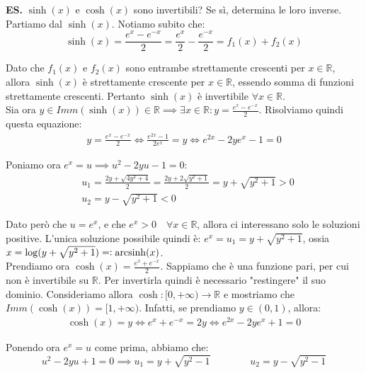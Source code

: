 \documentclass{article}
\DeclareMathOperator{\arcsinh}{arcsinh}
\begin{document}
\noindent\textbf{ES.} $\sinh(x)$ e $\cosh(x)$ sono invertibili? Se sì, determina le loro inverse. \\
Partiamo dal $\sinh(x)$. Notiamo subito che:
\begin{equation*}
    \sinh(x) = \frac{e^x - e^{-x}}{2} = \frac{e^x}{2} - \frac{e^{-x}}{2} = f_1(x) + f_2(x)
\end{equation*}

\noindent Dato che $f_1(x)$ e $f_2(x)$ sono entrambe strettamente crescenti per $x \in \mathbb{R}$, allora $\sinh(x)$ è strettamente crescente per $x \in \mathbb{R}$, essendo somma di funzioni strettamente crescenti. Pertanto $\sinh(x)$ è invertibile $\forall x \in \mathbb{R}$.\\
Sia ora $y \in Imm(\sinh(x)) \in \mathbb{R} \implies \exists x \in \mathbb{R} : y = \frac{e^x - e^{-x}}{2}$. Risolviamo quindi questa equazione:
\begin{align*}
    y = \frac{e^x - e^{-x}}{2} \iff \frac{e^{2x} - 1}{2e^x} = y \iff e^{2x} - 2ye^x - 1 = 0
\end{align*}

\noindent Poniamo ora $e^x = u \implies u^2 - 2yu - 1 = 0$:
\begin{align*}
    &u_1 = \frac{2y + \sqrt{4y^2 + 4}}{2} = \frac{2y + 2\sqrt{y^2 + 1}}{2} = y + \sqrt{y^2 + 1} > 0 \\
    & u_2 = y - \sqrt{y^2 + 1} < 0
\end{align*}

\noindent Dato però che $u = e^x$, e che $e^x > 0 \quad \forall x \in \mathbb{R}$, allora ci interessano solo le soluzioni positive. L'unica soluzione possibile quindi è: $e^x = u_1 = y + \sqrt{y^2 + 1}$, ossia $x = \log(y + \sqrt{y^2 + 1}) = \vcentcolon \arcsinh(x)$.\\
Prendiamo ora $\cosh(x) = \frac{e^x + e^{-x}}{2}$. Sappiamo che è una funzione pari, per cui non è invertibile su $\mathbb{R}$. Per invertirla quindi è necessario "restingere" il suo dominio. Consideriamo allora $\cosh: [0, +\infty) \xrightarrow{} \mathbb{R}$ e mostriamo che $Imm(\cosh(x)) = [1, +\infty)$. Infatti, se prendiamo $y \in (0, 1)$, allora:
\begin{align*}
    \cosh(x) = y \iff e^x + e^{-x} = 2y \iff e^{2x} - 2ye^x + 1 = 0
\end{align*}

\noindent Ponendo ora $e^x = u$ come prima, abbiamo che:
\begin{equation*}
    u^2 - 2yu + 1 = 0 \implies u_1 = y + \sqrt{y^2 - 1} \qquad \qquad u_2 = y - \sqrt{y^2 - 1}
\end{equation*}
\end{document}

